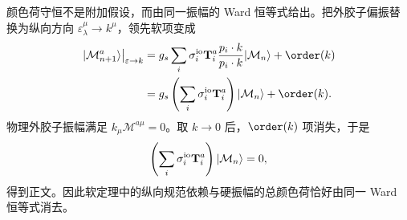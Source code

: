 \begin{derivation}
颜色荷守恒不是附加假设，而由同一振幅的 Ward 恒等式给出。把外胶子偏振替换为纵向方向 $\varepsilon_\lambda^\mu\to k^\mu$，领先软项变成
\begin{align*}
 \left.|\mathcal M_{n+1}^{a}\rangle\right|_{\varepsilon\to k}
 &=g_s\sum_i\sigma_i^{\rm io}\mathbf T_i^a
 \frac{p_i\cdot k}{p_i\cdot k}|\mathcal M_n\rangle+\order(k)\\
 &=g_s\left(\sum_i\sigma_i^{\rm io}\mathbf T_i^a\right)|\mathcal M_n\rangle+\order(k).
\end{align*}
物理外胶子振幅满足 $k_\mu\mathcal M^{a\mu}=0$。取 $k\to0$ 后，$\order(k)$ 项消失，于是
\begin{equation*}
 \left(\sum_i\sigma_i^{\rm io}\mathbf T_i^a\right)|\mathcal M_n\rangle=0,
\end{equation*}
得到正文。因此软定理中的纵向规范依赖与硬振幅的总颜色荷恰好由同一 Ward 恒等式消去。
\end{derivation}

